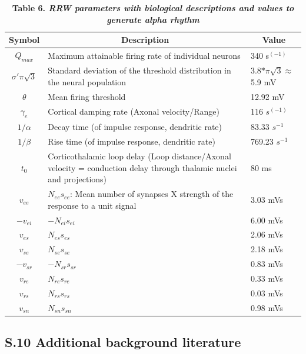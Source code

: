 \documentclass[12pt,twoside]{article}
\begin{document}
\begin{table}[H]
\begin{tabular}{|c|p{12cm}|p{2.5cm}| }
\hline
Symbol & \multicolumn{1}{|c|}{Description} & \multicolumn{1}{c|}{Value}  \\ 
 \hline
$Q_{max}$ & Maximum attainable firing rate of individual neurons & 340 s$^{(-1)}$\\ 
 \hline
$\sigma'\pi \sqrt{3}$ & Standard deviation of the threshold distribution in the neural population & 3.8$*\pi \sqrt{3} \approx $ 5.9  mV\\ 
 \hline
$\theta$ & Mean firing threshold & 12.92 mV \\
 \hline
$\gamma_{e}$ & Cortical damping rate (Axonal velocity/Range) & 116 $s^{(-1)}$\\
 \hline
$1/\alpha$ & Decay time (of impulse response, dendritic rate) & 83.33 $s^{-1}$\\
 \hline
$1/\beta$ & Rise time (of impulse response, dendritic rate) & 769.23 $s^{-1}$\\
\hline
$t_{0}$ & Corticothalamic loop delay (Loop distance/Axonal velocity = conduction delay through thalamic nuclei and projections) & 80 ms\\
\hline
$v_{ee}$ & $N_{ee}s_{ee}$: Mean number of synapses X strength of the response to a unit signal & 3.03 mVs\\
\hline
$-v_{ei}$ & $-N_{ei}s_{ei}$ & 6.00 mVs\\
\hline
$v_{es}$ & $N_{es}s_{es}$ & 2.06 mVs\\
\hline
$v_{se}$ & $N_{se}s_{se}$ & 2.18 mVs\\
\hline
$-v_{sr}$ & $-N_{sr}s_{sr}$ & 0.83 mVs\\
\hline
$v_{re}$ & $N_{re}s_{re}$ & 0.33 mVs\\
\hline
$v_{rs}$ & $N_{rs}s_{rs}$ & 0.03 mVs\\
\hline
$v_{sn}$ & $N_{sn}s_{sn}$ & 0.98 mVs\\
\hline
\end{tabular}
\caption*{\textbf{Table 6.  \textit{RRW parameters with biological descriptions and values to generate alpha rhythm}}}
\label{tab:Robinson}
\end{table}



\newpage
\subsection*{S.10 Additional background literature}
\end{document}
